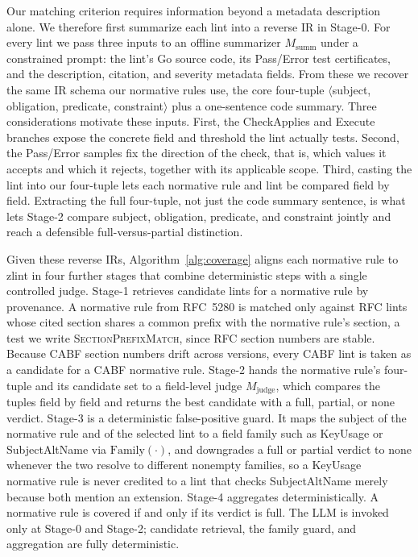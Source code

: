 Our matching criterion requires information beyond a metadata description
alone. We therefore first summarize each lint into a reverse IR in Stage-0. For
every lint we pass three inputs to an offline summarizer
$M_{\mathrm{summ}}$ under a constrained prompt: the lint's Go source code, its
Pass/Error test certificates, and the description, citation, and severity
metadata fields. From these we recover the same IR schema our normative rules
use, the core four-tuple $\langle$subject, obligation, predicate, constraint$\rangle$
plus a one-sentence code summary. Three considerations motivate these inputs.
First, the CheckApplies and Execute branches expose the concrete field and
threshold the lint actually tests. Second, the Pass/Error samples fix the
direction of the check, that is, which values it accepts and which it rejects,
together with its applicable scope. Third, casting the lint into our four-tuple
lets each normative rule and lint be compared field by field. Extracting the
full four-tuple, not just the code summary sentence, is what lets Stage-2
compare subject, obligation, predicate, and constraint jointly and reach a
defensible full-versus-partial distinction.



Given these reverse IRs, Algorithm~\ref{alg:coverage} aligns each normative
rule to zlint in four further stages that combine deterministic steps with a
single controlled judge. Stage-1 retrieves candidate lints for a normative rule
by provenance. A normative rule from RFC~5280 is matched only against RFC lints
whose cited section shares a common prefix with the normative rule's section,
a test we write \textsc{SectionPrefixMatch}, since RFC section numbers are
stable. Because CABF section numbers drift across versions, every CABF lint is
taken as a candidate for a CABF normative rule. Stage-2 hands the normative
rule's four-tuple and its candidate set to a field-level judge $M_{\mathrm{judge}}$,
which compares the tuples field by field and returns the best candidate with a
full, partial, or none verdict. Stage-3 is a deterministic false-positive
guard. It maps the subject of the normative rule and of the selected lint to a
field family such as KeyUsage or SubjectAltName via $\mathrm{Family}(\cdot)$,
and downgrades a full or partial verdict to none whenever the two resolve to
different nonempty families, so a KeyUsage normative rule is never credited to
a lint that checks SubjectAltName merely because both mention an extension.
Stage-4 aggregates deterministically. A normative rule is covered if and only
if its verdict is full. The LLM is invoked only
at Stage-0 and Stage-2; candidate
retrieval, the family guard, and aggregation are fully deterministic.

